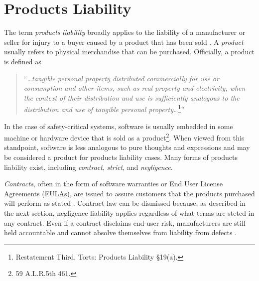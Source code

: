 \section{Products Liability}\label{S:Liability}
The term \textit{products liability} broadly applies to the liability of a
manufacturer or seller for injury to a buyer caused by a product that has been
sold \cite{Testing2005}. A \textit{product} usually refers to physical 
merchandise that can be purchased. Officially, a product is defined as 
\begin{quote}
``\textit{\ldots tangible personal property distributed commercially for use or
consumption and other items, such as real property and electricity, when the
context of their distribution and use is sufficiently analogous to the
distribution and use of tangible personal property\ldots}\footnote{Restatement
Third, Torts: Products Liability \S 19(a).}''
\end{quote}

In the case of safety-critical systems, software is usually embedded in
some machine or hardware device \cite{Leveson95} that is sold as a 
product\footnote{59 A.L.R.5th 461.}. When viewed from this standpoint, software
is less analogous to pure thoughts and expressions and may be considered a
product for products liability cases. Many forms of
products liability exist, including \textit{contract}, \textit{strict}, and
\textit{negligence}.

\textit{Contracts}, often in the form of software warranties or End User License
Agreements (EULAs), are issued to assure customers that the products purchased
will perform as stated \cite{Armour93}. Contract law can be dismissed because,
as described in the next section, negligence liability applies regardless of
what terms are steted in any contract. Even if a contract disclaims end-user
risk, manufacturers are still held accountable and cannot absolve themselves
from liability from defects \cite{Ryan03}.

